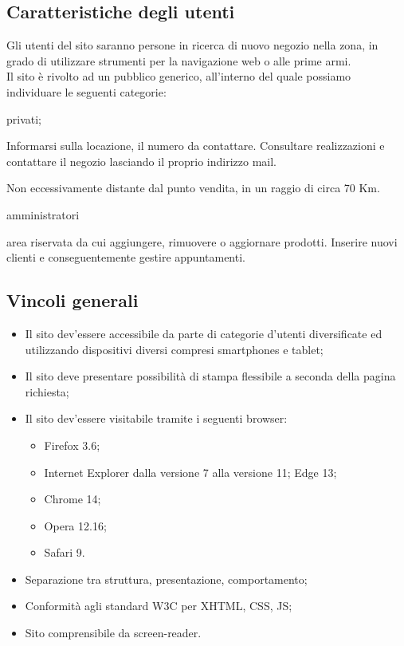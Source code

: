 \documentclass[12pt,a4paper,titlepage]{article}
\begin{document}
	\subsection{Caratteristiche degli utenti}{
		Gli utenti del sito saranno persone in ricerca di nuovo negozio nella zona, in grado di utilizzare strumenti per la navigazione web o alle prime armi. \\
		Il sito è rivolto ad un pubblico generico, all'interno del quale possiamo individuare le seguenti categorie:
		\begin{description}\itemsep1pt
			\item[Categoria di utenti:] privati;
			\begin{description}\itemsep1pt
				\item[Funzionalità:] Informarsi sulla locazione, il numero da contattare. Consultare realizzazioni e contattare il negozio lasciando il proprio indirizzo mail.
				\item[Termini generali:] Non eccessivamente distante dal punto vendita, in un raggio di circa 70 Km.
			\end{description}
			\item[Categoria di utenti:] amministratori
			\begin{description}\itemsep1pt
				\item[Funzionalità:] area riservata da cui aggiungere, rimuovere o aggiornare prodotti. Inserire nuovi clienti e conseguentemente gestire appuntamenti. 
			\end{description}
		\end{description}
	\subsection{Vincoli generali}{
		\begin{itemize}\itemsep1pt
			\item Il sito dev'essere accessibile da parte di categorie d'utenti diversificate ed utilizzando dispositivi diversi compresi smartphones e tablet;
			\item Il sito deve presentare possibilità di stampa flessibile a seconda della pagina richiesta;
			\item Il sito dev'essere visitabile tramite i seguenti browser: 
			\begin{itemize}
				\item Firefox 3.6;
				\item Internet Explorer dalla versione 7 alla versione 11; Edge 13;
				\item Chrome 14;
				\item Opera 12.16;
				\item Safari 9.
			\end{itemize}
			\item Separazione tra struttura, presentazione, comportamento;
			\item Conformità agli standard W3C per XHTML, CSS, JS;
			\item Sito comprensibile da screen-reader.
		\end{itemize}
	}
}
\end{document}
